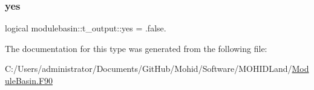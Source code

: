 \mbox{\label{structmodulebasin_1_1t__output_a59bf81178f4321e9c24db73b820899a1}} 
\subsubsection{\texorpdfstring{yes}{yes}}
{\footnotesize\ttfamily logical modulebasin\+::t\+\_\+output\+::yes = .false.\hspace{0.3cm}{\ttfamily [private]}}



The documentation for this type was generated from the following file\+:\begin{DoxyCompactItemize}
\item 
C\+:/\+Users/administrator/\+Documents/\+Git\+Hub/\+Mohid/\+Software/\+M\+O\+H\+I\+D\+Land/\mbox{\hyperlink{_module_basin_8_f90}{Module\+Basin.\+F90}}\end{DoxyCompactItemize}
